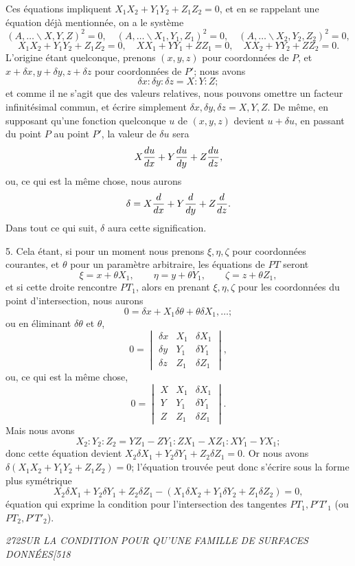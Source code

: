 \documentclass[11pt]{article}
\newcommand{\phead}[3]{\noindent\textit{#1\hfill #2\hfill #3}\par\medskip}
\newcommand{\qform}[2]{(#1\backslash #2)^2}
\newcommand{\D}{\delta}
\begin{document}
Ces \'equations impliquent $X_1X_2+Y_1Y_2+Z_1Z_2=0$, et en se rappelant une \'equation
d\'ej\`a mentionn\'ee, on a le syst\`eme
\[
\qform{A,\ldots}{X,Y,Z}=0,\quad
\qform{A,\ldots}{X_1,Y_1,Z_1}=0,\quad
\qform{A,\ldots}{X_2,Y_2,Z_2}=0,
\]
\[
X_1X_2+Y_1Y_2+Z_1Z_2=0,\quad
XX_1+YY_1+ZZ_1=0,\quad
XX_2+YY_2+ZZ_2=0.
\]
L'origine \'etant quelconque, prenons $(x,y,z)$ pour coordonn\'ees de $P$, et
$x+\D x,y+\D y,z+\D z$ pour coordonn\'ees de $P'$; nous avons
\[
\D x:\D y:\D z=X:Y:Z;
\]
et comme il ne s'agit que des valeurs relatives, nous pouvons omettre un facteur
infinit\'esimal commun, et \'ecrire simplement $\D x,\D y,\D z=X,Y,Z$. De m\^eme, en
supposant qu'une fonction quelconque $u$ de $(x,y,z)$ devient $u+\D u$, en passant du
point $P$ au point $P'$, la valeur de $\D u$ sera
\[
X{du\over dx}+Y{du\over dy}+Z{du\over dz},
\]
ou, ce qui est la m\^eme chose, nous aurons
\[
\D=X{d\over dx}+Y{d\over dy}+Z{d\over dz}.
\]
Dans tout ce qui suit, $\D$ aura cette signification.

5. Cela \'etant, si pour un moment nous prenons $\xi,\eta,\zeta$ pour coordonn\'ees
courantes, et $\theta$ pour un param\`etre arbitraire, les \'equations de $PT$ seront
\[
\xi=x+\theta X_1,\qquad \eta=y+\theta Y_1,\qquad \zeta=z+\theta Z_1,
\]
et si cette droite rencontre $PT_1$, alors en prenant $\xi,\eta,\zeta$ pour les
coordonn\'ees du point d'intersection, nous aurons
\[
0=\D x+X_1\D\theta+\theta\D X_1,\ldots;
\]
ou en \'eliminant $\D\theta$ et $\theta$,
\[
0=\begin{vmatrix}
\D x&X_1&\D X_1\\
\D y&Y_1&\D Y_1\\
\D z&Z_1&\D Z_1
\end{vmatrix},
\]
ou, ce qui est la m\^eme chose,
\[
0=\begin{vmatrix}
X&X_1&\D X_1\\
Y&Y_1&\D Y_1\\
Z&Z_1&\D Z_1
\end{vmatrix}.
\]
Mais nous avons
\[
X_2:Y_2:Z_2=YZ_1-ZY_1:ZX_1-XZ_1:XY_1-YX_1;
\]
donc cette \'equation devient $X_2\D X_1+Y_2\D Y_1+Z_2\D Z_1=0$. Or nous avons
$\D(X_1X_2+Y_1Y_2+Z_1Z_2)=0$; l'\'equation trouv\'ee peut donc s'\'ecrire sous la forme plus
sym\'etrique
\[
X_2\D X_1+Y_2\D Y_1+Z_2\D Z_1-(X_1\D X_2+Y_1\D Y_2+Z_1\D Z_2)=0,
\]
\'equation qui exprime la condition pour l'intersection des tangentes
$PT_1,P'T'_1$ (ou $PT_2,P'T'_2$).

\clearpage

\phead{272}{SUR LA CONDITION POUR QU'UNE FAMILLE DE SURFACES DONN\'EES}{[518}
\end{document}

